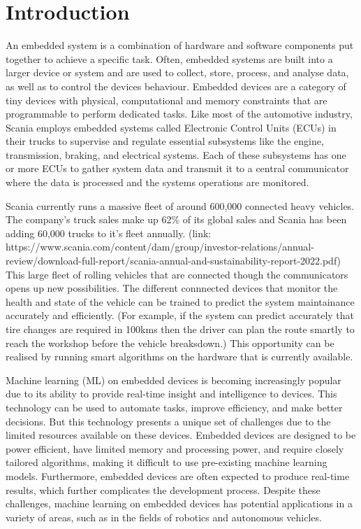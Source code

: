 \part{Introduction}

An embedded system is a combination of hardware and software components put together to achieve a specific task. Often, embedded systems are built into a larger device or system and are used to collect, store, process, and analyse data, as well as to control the device\textquotesingle s behaviour. Embedded devices are a category of tiny devices with physical, computational and memory constraints that are programmable to perform dedicated tasks.   
Like most of the automotive industry, Scania employs embedded systems called Electronic Control Units (ECUs) in their trucks to supervise and regulate essential subsystems like the engine, transmission, braking, and electrical systems. Each of these subsystems has one or more ECUs to gather system data and transmit it to a central communicator where the data is processed and the systems operations are monitored.

Scania currently runs a massive fleet of around 600,000 connected heavy vehicles. The company's truck sales make up 62\% of its global sales and Scania has been adding 60,000 trucks to it's fleet annually. (link: https://www.scania.com/content/dam/group/investor-relations/annual-review/download-full-report/scania-annual-and-sustainability-report-2022.pdf) This large fleet of rolling vehicles that are connected though the communicators opens up new possibilities. The different connnected devices that monitor the health and state of the vehicle can be trained to predict the system maintainance accurately and efficiently. (For example, if the system can predict accurately that tire changes are required in 100kms then the driver can plan the route smartly to reach the workshop before the vehicle breaksdown.) This opportunity can be realised by running smart algorithms on the hardware that is currently available.

Machine learning (ML) on embedded devices is becoming increasingly popular due to its ability to provide real-time insight and intelligence to devices. This technology can be used to automate tasks, improve efficiency, and make better decisions. But this technology presents a unique set of challenges due to the limited resources available on these devices. Embedded devices are designed to be power efficient, have limited memory and processing power, and require closely tailored algorithms, making it difficult to use pre-existing machine learning models. Furthermore, embedded devices are often expected to produce real-time results, which further complicates the development process. Despite these challenges, machine learning on embedded devices has potential applications in a variety of areas, such as in the fields of robotics and autonomous vehicles.

